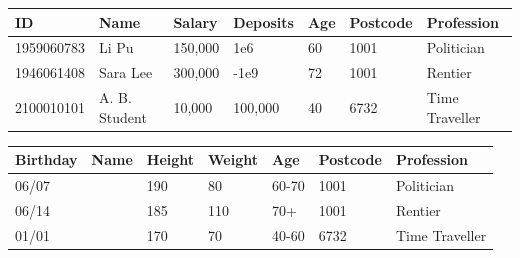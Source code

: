 \begin{frame}
  \begin{example}
    \begin{table}[H]
      \begin{tabular}{l|l|l|l|l|l|l}
        ID & Name &  Salary & Deposits & Age & Postcode & Profession\\
        \hline
        1959060783 & Li Pu & 150,000 & 1e6 & 60 & 1001 & Politician\\
        1946061408 & Sara Lee & 300,000 & -1e9 & 72 & 1001 & Rentier\\
        2100010101 & A. B. Student & 10,000 & 100,000 & 40 & 6732 & Time Traveller
      \end{tabular}
    \end{table}
  \end{example}
  
  \begin{example}
    \begin{table}[H]
      \begin{tabular}{l|l|l|l|l|l|l}
        Birthday & Name & Height  & Weight & Age & Postcode & Profession\\
        \hline
        06/07 & & 190 & 80 & 60-70 & 1001 & Politician\\
        06/14 &  & 185 & 110 & 70+ & 1001 & Rentier\\
        01/01 &  & 170 & 70 & 40-60 & 6732 & Time Traveller
      \end{tabular}
    \end{table}
  \end{example}
\end{frame}



